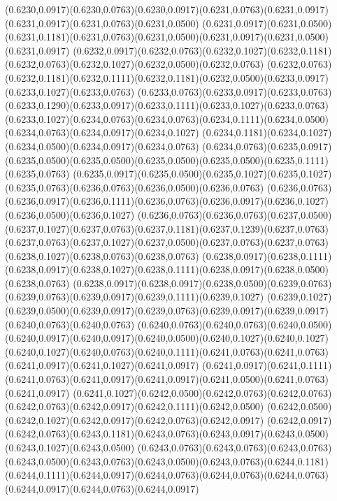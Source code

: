 (0.6230,0.0917)(0.6230,0.0763)(0.6230,0.0917)(0.6231,0.0763)(0.6231,0.0917)(0.6231,0.0917)(0.6231,0.0763)(0.6231,0.0500)
(0.6231,0.0917)(0.6231,0.0500)(0.6231,0.1181)(0.6231,0.0763)(0.6231,0.0500)(0.6231,0.0917)(0.6231,0.0500)(0.6231,0.0917)
(0.6232,0.0917)(0.6232,0.0763)(0.6232,0.1027)(0.6232,0.1181)(0.6232,0.0763)(0.6232,0.1027)(0.6232,0.0500)(0.6232,0.0763)
(0.6232,0.0763)(0.6232,0.1181)(0.6232,0.1111)(0.6232,0.1181)(0.6232,0.0500)(0.6233,0.0917)(0.6233,0.1027)(0.6233,0.0763)
(0.6233,0.0763)(0.6233,0.0917)(0.6233,0.0763)(0.6233,0.1290)(0.6233,0.0917)(0.6233,0.1111)(0.6233,0.1027)(0.6233,0.0763)
(0.6233,0.1027)(0.6234,0.0763)(0.6234,0.0763)(0.6234,0.1111)(0.6234,0.0500)(0.6234,0.0763)(0.6234,0.0917)(0.6234,0.1027)
(0.6234,0.1181)(0.6234,0.1027)(0.6234,0.0500)(0.6234,0.0917)(0.6234,0.0763)
\PST@Solid(0.6234,0.0763)(0.6235,0.0917)(0.6235,0.0500)(0.6235,0.0500)(0.6235,0.0500)(0.6235,0.0500)(0.6235,0.1111)(0.6235,0.0763)
(0.6235,0.0917)(0.6235,0.0500)(0.6235,0.1027)(0.6235,0.1027)(0.6235,0.0763)(0.6236,0.0763)(0.6236,0.0500)(0.6236,0.0763)
(0.6236,0.0763)(0.6236,0.0917)(0.6236,0.1111)(0.6236,0.0763)(0.6236,0.0917)(0.6236,0.1027)(0.6236,0.0500)(0.6236,0.1027)
(0.6236,0.0763)(0.6236,0.0763)(0.6237,0.0500)(0.6237,0.1027)(0.6237,0.0763)(0.6237,0.1181)(0.6237,0.1239)(0.6237,0.0763)
(0.6237,0.0763)(0.6237,0.1027)(0.6237,0.0500)(0.6237,0.0763)(0.6237,0.0763)(0.6238,0.1027)(0.6238,0.0763)(0.6238,0.0763)
(0.6238,0.0917)(0.6238,0.1111)(0.6238,0.0917)(0.6238,0.1027)(0.6238,0.1111)(0.6238,0.0917)(0.6238,0.0500)(0.6238,0.0763)
(0.6238,0.0917)(0.6238,0.0917)(0.6238,0.0500)(0.6239,0.0763)(0.6239,0.0763)(0.6239,0.0917)(0.6239,0.1111)(0.6239,0.1027)
(0.6239,0.1027)(0.6239,0.0500)(0.6239,0.0917)(0.6239,0.0763)(0.6239,0.0917)(0.6239,0.0917)(0.6240,0.0763)(0.6240,0.0763)
(0.6240,0.0763)(0.6240,0.0763)(0.6240,0.0500)(0.6240,0.0917)(0.6240,0.0917)(0.6240,0.0500)(0.6240,0.1027)(0.6240,0.1027)
(0.6240,0.1027)(0.6240,0.0763)(0.6240,0.1111)(0.6241,0.0763)(0.6241,0.0763)(0.6241,0.0917)(0.6241,0.1027)(0.6241,0.0917)
(0.6241,0.0917)(0.6241,0.1111)(0.6241,0.0763)(0.6241,0.0917)(0.6241,0.0917)(0.6241,0.0500)(0.6241,0.0763)(0.6241,0.0917)
(0.6241,0.1027)(0.6242,0.0500)(0.6242,0.0763)(0.6242,0.0763)(0.6242,0.0763)(0.6242,0.0917)(0.6242,0.1111)(0.6242,0.0500)
(0.6242,0.0500)(0.6242,0.1027)(0.6242,0.0917)(0.6242,0.0763)(0.6242,0.0917)
\PST@Solid(0.6242,0.0917)(0.6242,0.0763)(0.6243,0.1181)(0.6243,0.0763)(0.6243,0.0917)(0.6243,0.0500)(0.6243,0.1027)(0.6243,0.0500)
(0.6243,0.0763)(0.6243,0.0763)(0.6243,0.0763)(0.6243,0.0500)(0.6243,0.0763)(0.6243,0.0500)(0.6243,0.0763)(0.6244,0.1181)
(0.6244,0.1111)(0.6244,0.0917)(0.6244,0.0763)(0.6244,0.0763)(0.6244,0.0763)(0.6244,0.0917)(0.6244,0.0763)(0.6244,0.0917)
